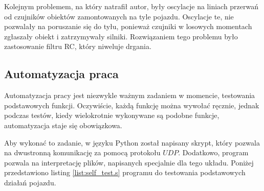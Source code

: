         Kolejnym problemem, na który natrafił autor, były oscylacje na liniach przerwań od czujników obiektów zamontowanych na tyle pojazdu.
        Oscylacje te, nie pozwalały na poruszanie się do tyłu, ponieważ czujniki w losowych momentach zgłaszały obiekt i zatrzymywały silniki.
        Rozwiązaniem tego problemu było zastosowanie filtru RC, który niweluje drgania.



    \subsection{Automatyzacja praca}
        Automatyzacja pracy jest niezwykle ważnym zadaniem w momencie, testowania podstawowych funkcji.
        Oczywiście, każdą funkcję można wywołać ręcznie, jednak podczas testów, kiedy wielokrotnie wykonywane są podobne funkcje, automatyzacja staje się obowiązkowa.

        Aby wykonać to zadanie, w języku Python został napisany skrypt, który pozwala na dwustronną komunikację za pomocą protokołu $UDP$.
        Dodatkowo, program pozwala na interpretację plików, napisanych specjalnie dla tego układu.
        Poniżej przedstawiono listing \eqref{list:self_test.s} programu do testowania podstawowych działań pojazdu.

        
